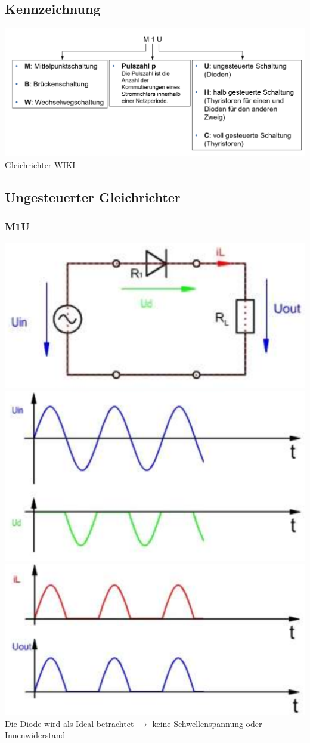 \subsection{Kennzeichnung}
\includegraphics[width=0.8\linewidth]{images/SRKennzeichnung}\newline
\href{https://de.wikipedia.org/wiki/Gleichrichter}{Gleichrichter WIKI}

\clearpage
\subsection{Ungesteuerter Gleichrichter}
\subsubsection{M1U}
\includegraphics[width=0.4\linewidth]{images/PrakUGM1}
\includegraphics[width=0.3\linewidth]{images/PrakUGM1Kl1}
\includegraphics[width=0.3\linewidth]{images/PrakUGM1Kl2}\newline
Die Diode wird als Ideal betrachtet $ \rightarrow $ keine Schwellenspannung oder Innenwiderstand

